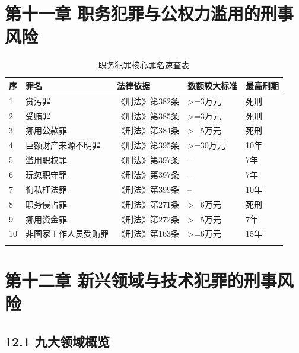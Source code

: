 \documentclass[12pt,a4paper]{article}
\begin{document}
\clearpage

\section{第十一章 职务犯罪与公权力滥用的刑事风险}

\begin{longtable}{p{0.5cm}p{4cm}p{3cm}p{3cm}p{2cm}}
  \toprule
  \textbf{序} & \textbf{罪名} & \textbf{法律依据} & \textbf{数额较大标准} & \textbf{最高刑期} \\
  \midrule
  1 & 贪污罪 & 《刑法》第382条 & >=3万元 & 死刑 \\
  2 & 受贿罪 & 《刑法》第385条 & >=3万元 & 死刑 \\
  3 & 挪用公款罪 & 《刑法》第384条 & >=5万元 & 死刑 \\
  4 & 巨额财产来源不明罪 & 《刑法》第395条 & >=30万元 & 10年 \\
  5 & 滥用职权罪 & 《刑法》第397条 & -- & 7年 \\
  6 & 玩忽职守罪 & 《刑法》第397条 & -- & 7年 \\
  7 & 徇私枉法罪 & 《刑法》第399条 & -- & 10年 \\
  8 & 职务侵占罪 & 《刑法》第271条 & >=6万元 & 死刑 \\
  9 & 挪用资金罪 & 《刑法》第272条 & >=5万元 & 7年 \\
  10 & 非国家工作人员受贿罪 & 《刑法》第163条 & >=6万元 & 15年 \\
  \bottomrule
  \caption{职务犯罪核心罪名速查表}
\end{longtable}

\clearpage

\section{第十二章 新兴领域与技术犯罪的刑事风险}

\subsection{12.1 九大领域概览}
\end{document}

